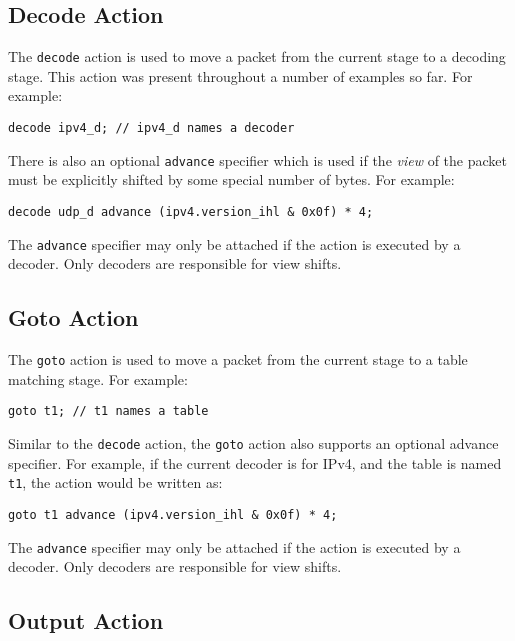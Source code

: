 \subsection{Decode Action} \label{tut:decode_action}

The \texttt{decode} action is used to move a packet from the current stage to a
decoding stage. This action was present throughout a number of examples so far.
For example:

\begin{lstlisting}
decode ipv4_d; // ipv4_d names a decoder
\end{lstlisting}

There is also an optional \texttt{advance} specifier which is used if
the \textit{view} of the packet must be explicitly shifted by some special
number of bytes. For example:

\begin{lstlisting}
decode udp_d advance (ipv4.version_ihl & 0x0f) * 4;
\end{lstlisting}

The \texttt{advance} specifier may only be attached if the action is executed by a
decoder. Only decoders are responsible for view shifts.

\subsection{Goto Action} \label{tut:goto_action}

The \texttt{goto} action is used to move a packet from the current stage to a
table matching stage. For example:

\begin{lstlisting}
goto t1; // t1 names a table
\end{lstlisting}

Similar to the \texttt{decode} action, the \texttt{goto} action also supports an
optional advance specifier. For example, if the current decoder is for IPv4, and
the table is named \texttt{t1}, the action would be written as:

\begin{lstlisting}
goto t1 advance (ipv4.version_ihl & 0x0f) * 4;
\end{lstlisting}

The \texttt{advance} specifier may only be attached if the action is executed by a
decoder. Only decoders are responsible for view shifts.

\subsection{Output Action} \label{tut:output_action}


